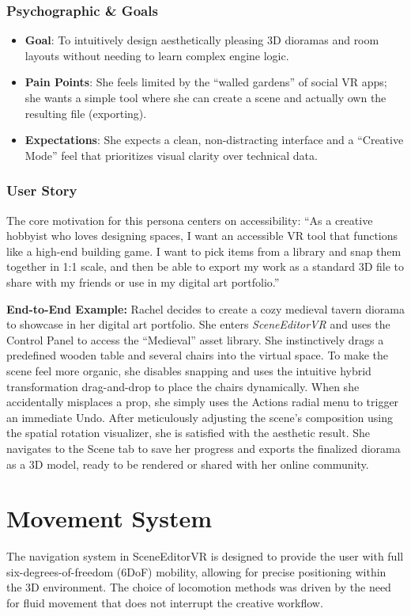 \documentclass[inscr,ack,preface]{dithesis}
\begin{document}
\subsubsection{Psychographic \& Goals}

\begin{itemize}
  \item \textbf{Goal}: To intuitively design aesthetically pleasing 3D dioramas and room layouts without needing to learn complex engine logic.
  \item \textbf{Pain Points}: She feels limited by the ``walled gardens'' of social VR apps; she wants a simple tool where she can create a
        scene and actually own the resulting file (exporting).
  \item \textbf{Expectations}: She expects a clean, non-distracting interface and a ``Creative Mode'' feel that prioritizes
        visual clarity over technical data.
\end{itemize}

\subsubsection{User Story}

The core motivation for this persona centers on accessibility: ``As a creative hobbyist who loves designing spaces, I want an accessible VR tool that functions like a high-end building game.
I want to pick items from a library and snap them together in 1:1 scale, and then be able to export my work as a standard 3D file
to share with my friends or use in my digital art portfolio.''

\textbf{End-to-End Example:} Rachel decides to create a cozy medieval tavern diorama to
showcase in her digital art portfolio. She enters \textit{SceneEditorVR} and uses the
Control Panel to access the ``Medieval'' asset library.
She instinctively drags a predefined wooden table and several chairs into the virtual space.
To make the scene feel more organic, she disables snapping and uses the intuitive hybrid
transformation drag-and-drop to place the chairs dynamically. When she accidentally misplaces
a prop, she simply uses the Actions radial menu to trigger an immediate Undo.
After meticulously adjusting the scene's composition using the spatial rotation visualizer,
she is satisfied with the aesthetic result.
She navigates to the Scene tab to save her progress and exports the finalized diorama as a 3D model, ready to be rendered or
shared with her online community.

\section{Movement System}
The navigation system in SceneEditorVR is designed to provide the user with full six-degrees-of-freedom (6DoF) mobility, allowing for
precise positioning within the 3D environment. The choice of locomotion methods was driven by the need for fluid movement that
does not interrupt the creative workflow.
\end{document}
